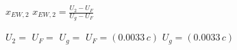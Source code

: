 \( x_{EW,2} \)  
\( x_{EW,2} = \frac{U_2 - U_F}{U_g - U_F} \)  

\( U_2 = \)  
\( U_F = \)  
\( U_g = \)  
\( U_F = (0.0033 \, c) \)  
\( U_g = (0.0033 \, c) \)